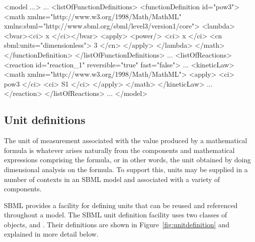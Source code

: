 \begin{example}
<model ...>
    ...
    <listOfFunctionDefinitions>
        <functionDefinition id="pow3">
            <math xmlns="http://www.w3.org/1998/Math/MathML"
                  xmlns:sbml="http://www.sbml.org/sbml/level3/version1/core">
                <lambda>
                    <bvar><ci> x </ci></bvar>
                    <apply>
                        <power/>
                        <ci> x </ci>
                        <cn sbml:units="dimensionless"> 3 </cn>
                    </apply>
                </lambda>
            </math>
        </functionDefinition>
    </listOfFunctionDefinitions>
    ...
    <listOfReactions>
        <reaction id="reaction_1" reversible="true" fast="false">
            ...
            <kineticLaw>
                <math xmlns="http://www.w3.org/1998/Math/MathML">
                    <apply>
                        <ci> pow3 </ci>
                        <ci> S1 </ci>
                     </apply>
                </math>
            </kineticLaw>
            ...
        </reaction>
    </listOfReactions>
    ...
</model>\end{example}


\subsection{Unit definitions}
\label{sec:unitdefinitions}

The unit of measurement associated with the value produced by a
mathematical formula is whatever arises naturally from the
components and mathematical expressions comprising the formula, or
in other words, the unit obtained by doing dimensional analysis on
the formula.  To support this, units may be supplied in a number
of contexts in an SBML model and associated with a variety of
components.

SBML provides a facility for defining units that can be reused and
referenced throughout a model.  The SBML unit definition facility
uses two classes of objects, \UnitDefinition and \Unit.  Their
definitions are shown in Figure~\vref{fig:unitdefinition} and
explained in more detail below.

